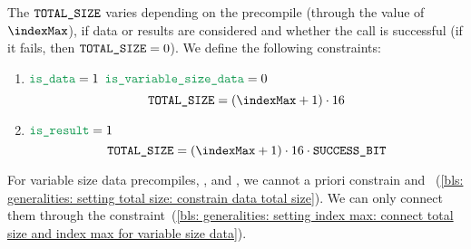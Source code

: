 The $\texttt{TOTAL\_SIZE}$ varies depending on the precompile (through the value of $\indexMax$), if data or results are considered and whether the call is successful (if it fails, then $\texttt{TOTAL\_SIZE} = 0$). 
We define the following constraints:
\begin{enumerate}
  \item \label{bls: generalities: setting total size: constrain data total size} \If $\locIsData = 1$ \et $\locIsVariableSizeData = 0$ \Then
    \[
        \blsTotalSize = (\indexMax + 1) \cdot 16
    \]
  \item \If $\locIsResult = 1$ \Then
    \[
        \blsTotalSize = (\indexMax + 1) \cdot 16 \cdot \blsSuccessBit
    \]
\end{enumerate}

\saNote{}
For variable size data precompiles, ,  and , we cannot a priori constrain \blsTotalSize{} and \indexMax{}~(\ref{bls: generalities: setting total size: constrain data total size}). We can only connect them through the constraint~(\ref{bls: generalities: setting index max: connect total size and index max for variable size data}).
